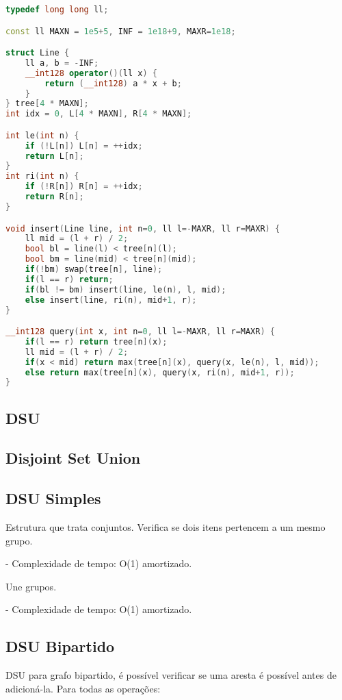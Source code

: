 \documentclass[11pt, a4paper, twoside]{article}
\begin{document}
\begin{lstlisting}[language=C++]
typedef long long ll;

const ll MAXN = 1e5+5, INF = 1e18+9, MAXR=1e18;

struct Line {
    ll a, b = -INF;
    __int128 operator()(ll x) { 
        return (__int128) a * x + b;
    }
} tree[4 * MAXN];
int idx = 0, L[4 * MAXN], R[4 * MAXN];

int le(int n) { 
    if (!L[n]) L[n] = ++idx;
    return L[n];
}
int ri(int n) { 
    if (!R[n]) R[n] = ++idx;
    return R[n];
}

void insert(Line line, int n=0, ll l=-MAXR, ll r=MAXR) {
    ll mid = (l + r) / 2;
    bool bl = line(l) < tree[n](l);
    bool bm = line(mid) < tree[n](mid);
    if(!bm) swap(tree[n], line);
    if(l == r) return;
    if(bl != bm) insert(line, le(n), l, mid);
    else insert(line, ri(n), mid+1, r);
}

__int128 query(int x, int n=0, ll l=-MAXR, ll r=MAXR) {
    if(l == r) return tree[n](x);
    ll mid = (l + r) / 2;
    if(x < mid) return max(tree[n](x), query(x, le(n), l, mid));
    else return max(tree[n](x), query(x, ri(n), mid+1, r));
}
\end{lstlisting}

\subsection{DSU}

\subsection{Disjoint Set Union}



\subsection{DSU Simples}

Estrutura que trata conjuntos.  
Verifica se dois itens pertencem a um mesmo grupo.

- Complexidade de tempo: O(1) amortizado.

Une grupos.

- Complexidade de tempo: O(1) amortizado.

\subsection{DSU Bipartido}

DSU para grafo bipartido, é possível verificar se uma aresta é possível antes de adicioná-la.  
Para todas as operações:
\end{document}
